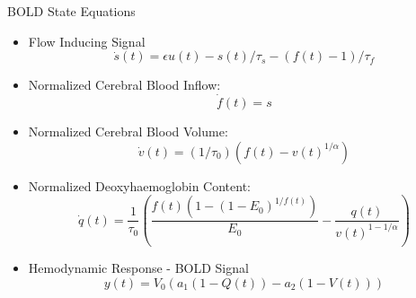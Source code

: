 \documentclass{beamer}
\begin{document}
\begin{frame}{BOLD State Equations}
  \small
  \begin{itemize}
    \item Flow Inducing Signal
    $$\dot{s}(t) = \epsilon u(t) - s(t)/\tau_s - (f(t)-1)/\tau_f$$
    \item Normalized Cerebral Blood Inflow:
    $$\dot{f}(t) = s $$
    \item Normalized Cerebral Blood Volume:
    $$\dot{v}(t) = (1/\tau_0)( f(t) - v(t) ^ {1/\alpha}) $$
    \item Normalized Deoxyhaemoglobin Content:\\
    $$\dot{q}(t) = \frac{1}{\tau_0}\left(\frac{f(t)(1-(1-E_0)^{1/f(t)})}{E_0} -
            \frac{q(t)}{v(t)^{1-1/\alpha}}\right)$$
    \item Hemodynamic Response - BOLD Signal
    $$y(t) = V_0(a_1( 1 - Q(t)) - a_2(1 - V(t)))$$
  \end{itemize}
\end{frame}
\end{document}
